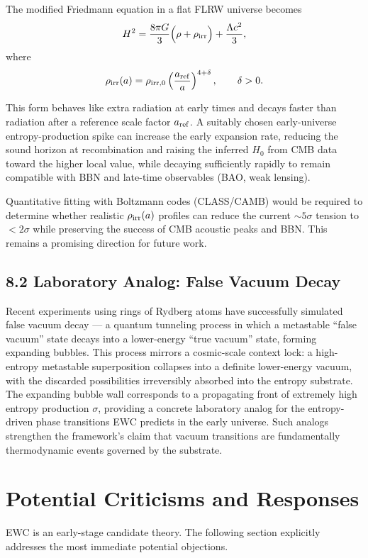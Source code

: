 \documentclass[11pt,letterpaper]{article}
\begin{document}
The modified Friedmann equation in a flat FLRW universe becomes
\[
H^2 = \frac{8\pi G}{3} \Bigl( \rho + \rho_{\rm irr} \Bigr) + \frac{\Lambda c^2}{3},
\]
where
\[
\rho_{\rm irr}(a) = \rho_{\rm irr,0} \left( \frac{a_{\rm ref}}{a} \right)^{4 + \delta}, \qquad \delta > 0.
\]

This form behaves like extra radiation at early times and decays faster than radiation after a reference scale factor \(a_{\rm ref}\). A suitably chosen early-universe entropy-production spike can increase the early expansion rate, reducing the sound horizon at recombination and raising the inferred \(H_0\) from CMB data toward the higher local value, while decaying sufficiently rapidly to remain compatible with BBN and late-time observables (BAO, weak lensing).

Quantitative fitting with Boltzmann codes (CLASS/CAMB) would be required to determine whether realistic \(\rho_{\rm irr}(a)\) profiles can reduce the current \(\sim 5\sigma\) tension to \(<2\sigma\) while preserving the success of CMB acoustic peaks and BBN. This remains a promising direction for future work.

\subsection{8.2 Laboratory Analog: False Vacuum Decay}
Recent experiments using rings of Rydberg atoms have successfully simulated false vacuum decay — a quantum tunneling process in which a metastable “false vacuum” state decays into a lower-energy “true vacuum” state, forming expanding bubbles. This process mirrors a cosmic-scale context lock: a high-entropy metastable superposition collapses into a definite lower-energy vacuum, with the discarded possibilities irreversibly absorbed into the entropy substrate. The expanding bubble wall corresponds to a propagating front of extremely high entropy production \(\sigma\), providing a concrete laboratory analog for the entropy-driven phase transitions EWC predicts in the early universe. Such analogs strengthen the framework’s claim that vacuum transitions are fundamentally thermodynamic events governed by the substrate.

\section{Potential Criticisms and Responses}
EWC is an early-stage candidate theory. The following section explicitly addresses the most immediate potential objections.
\end{document}
